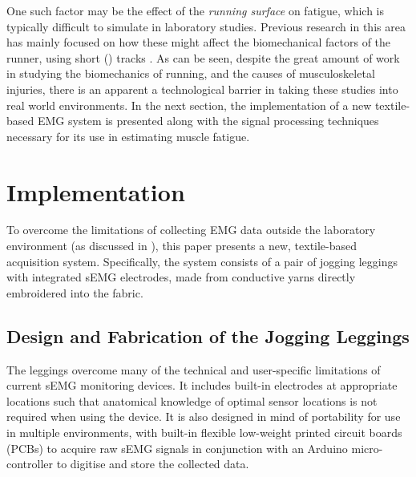 \documentclass[letterpaper, 10 pt, conference]{ieeeconf}
\begin{document}
One such factor may be the effect of the \emph{running surface} on fatigue, which is typically difficult to simulate in laboratory studies. Previous
research in this area has mainly focused on how these might affect the
biomechanical factors of the runner, using short () tracks \cite{ferris1998running,pinnington2005kinematic,tillman2002shoe}. As can be seen, despite the great amount of work in studying the biomechanics
of running, and the causes of musculoskeletal injuries, there is an apparent a
technological barrier in taking these studies into real world environments. In
the next section, the implementation of a new textile-based EMG system is
presented along with the signal processing techniques necessary for its use in
estimating muscle fatigue.












\section{Implementation}\label{s:methodology}
To overcome the limitations of collecting EMG data outside the laboratory
environment (as discussed in ), this paper presents a new,
textile-based acquisition system. Specifically, the system consists of a pair
of jogging leggings with integrated sEMG electrodes, made from conductive yarns
directly embroidered into the fabric. 

\subsection{Design and Fabrication of the Jogging Leggings}
The leggings overcome many of the technical and user-specific limitations of
current sEMG monitoring devices. It includes built-in electrodes at appropriate
locations such that anatomical knowledge of optimal sensor locations is not
required when using the device.  It is also designed in mind of portability
for use in multiple environments, with built-in flexible low-weight printed
circuit boards (PCBs) to acquire raw sEMG signals in conjunction with an
Arduino micro-controller to digitise and store the collected data.
\end{document}
